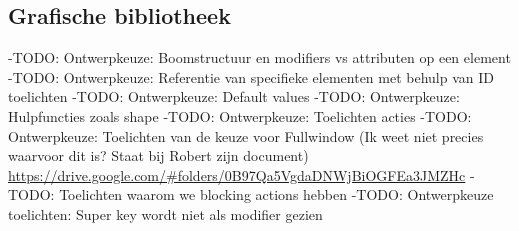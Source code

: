 \subsection{Grafische bibliotheek} \label{subsec:grafische_bibliotheek}

-TODO: Ontwerpkeuze: Boomstructuur en modifiers vs attributen op een element
-TODO: Ontwerpkeuze: Referentie van specifieke elementen met behulp van ID toelichten
-TODO: Ontwerpkeuze: Default values
-TODO: Ontwerpkeuze: Hulpfuncties zoals shape
-TODO: Ontwerpkeuze: Toelichten acties
-TODO: Ontwerpkeuze: Toelichten van de keuze voor Fullwindow (Ik weet niet precies waarvoor dit is? Staat bij Robert zijn document) \url{https://drive.google.com/#folders/0B97Qa5VgdaDNWjBiOGFEa3JMZHc}
-TODO: Toelichten waarom we blocking actions hebben
-TODO: Ontwerpkeuze toelichten: Super key wordt niet als modifier gezien